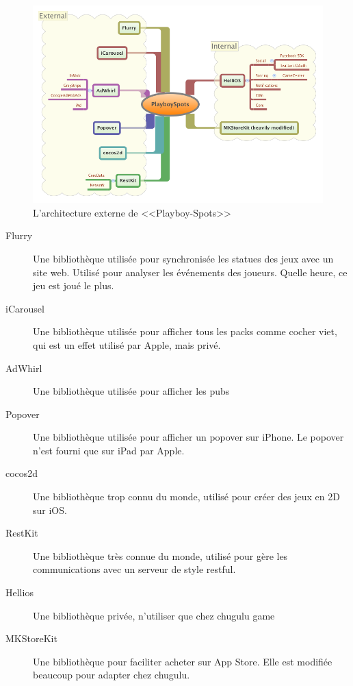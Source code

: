 \begin{figure}[htbp]
	\centering
		\includegraphics[width=7in]{XMinds/PlayboySpotsAppExternals.png}
	\caption{L'architecture externe de <<Playboy-Spots>>}
	\label{fig:XMinds_PlayboySpotsAppExternals}
\end{figure}

\begin{description}
	\item[Flurry] Une bibliothèque utilisée pour synchronisée les statues des jeux avec un site web. Utilisé pour analyser les événements des joueurs. Quelle heure, ce jeu est joué le plus.
	\item[iCarousel] Une bibliothèque utilisée pour afficher tous les packs comme cocher viet, qui est un effet utilisé par Apple, mais privé.
	\item[AdWhirl] Une bibliothèque utilisée pour afficher les pubs
	\item[Popover] Une bibliothèque utilisée pour afficher un popover sur iPhone. Le popover n'est fourni que sur iPad par Apple.
	\item[cocos2d] Une bibliothèque trop connu du monde, utilisé pour créer des jeux en 2D sur iOS.
	\item[RestKit] Une bibliothèque très connue du monde, utilisé pour gère les communications avec un serveur de style restful.
	\item[Hellios] Une bibliothèque privée, n'utiliser que chez chugulu game
	\item[MKStoreKit] Une bibliothèque pour faciliter acheter sur App Store. Elle est modifiée beaucoup pour adapter chez chugulu.
\end{description}


